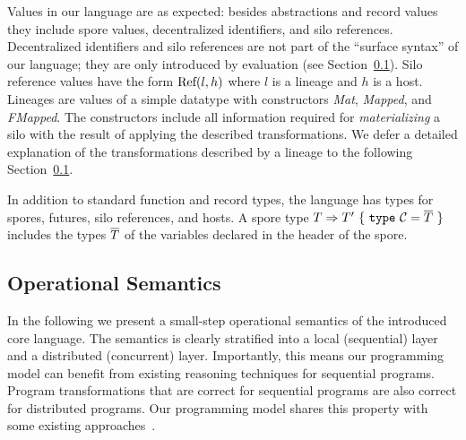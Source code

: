 Values in our language are as expected: besides abstractions and
record values they include spore values, decentralized identifiers,
and silo references. Decentralized identifiers and silo references are
not part of the ``surface syntax'' of our language; they are only
introduced by evaluation (see Section~\ref{sec:opsem}). Silo reference
values have the form ${\textrm{Ref}(l, h)}$ where $l$ is a lineage and $h$ is a
host. Lineages are values of a simple datatype with constructors {\em
  Mat}, {\em Mapped}, and {\em FMapped}. The constructors include all
information required for {\em materializing} a silo with the result of
applying the described transformations. We defer a detailed
explanation of the transformations described by a lineage to the
following Section~\ref{sec:opsem}.

In addition to standard function and record types, the language has
types for spores, futures, silo references, and hosts. A spore type $T
\Rightarrow T'~\{~\texttt{type}~\mathcal{C} = \overline{T}~\}$ includes the
types $\overline{T}$ of the variables declared in the header of the spore.

\subsection{Operational Semantics}\label{sec:opsem}

In the following we present a small-step operational semantics of the
introduced core language. The semantics is clearly stratified into a
local (sequential) layer and a distributed (concurrent)
layer. Importantly, this means our programming model can benefit from
existing reasoning techniques for sequential programs. Program
transformations that are correct for sequential programs are also
correct for distributed programs. Our programming model shares this
property with some existing approaches~\cite{ConcurrentHaskell}.

